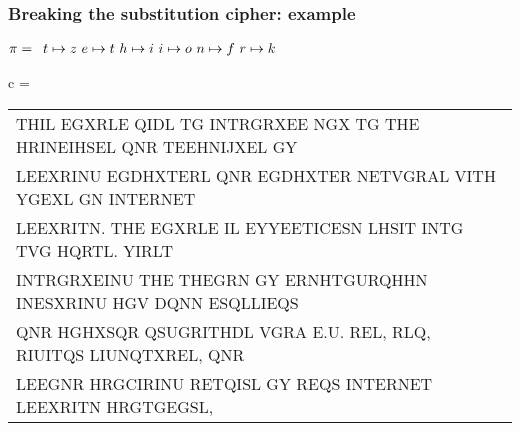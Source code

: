 \documentclass[aspectratio=169, lualatex, handout, 10pt,dvipsnames,svgnames]{beamer} %
\def\enbleu#1{\textcolor{bleu}{#1}}
\def\enrouge#1{\textcolor{rouge}{#1}}
\begin{document}
\begin{frame}
  \frametitle{Breaking the substitution cipher: example}
  
    \enrouge{
    \tiny{$\pi=
      \begin{array}[t]{l}
      t\mapsto z\ e\mapsto t\ h\mapsto i\ i\mapsto o\ n\mapsto f\ r\mapsto k
       \end{array}
      $}}
  \vspace{0.25cm}

  \color{vert}
  \tiny{c =
    \begin{tabular}[t]{l}
      \enbleu{T}\enbleu{H}\enbleu{I}L EGX\enbleu{R}L\enbleu{E} Q\enbleu{I}DL \enbleu{T}G \enbleu{I}\enbleu{N}\enbleu{T}\enbleu{R}GRXE\enbleu{E} NGX \enbleu{T}G \enbleu{T}\enbleu{H}\enbleu{E} H\enbleu{R}\enbleu{I}\enbleu{N}E\enbleu{I}HS\enbleu{E}L Q\enbleu{N}R \enbleu{T}\enbleu{E}E\enbleu{H}\enbleu{N}\enbleu{I}JX\enbleu{E}L GY \\
      L\enbleu{E}EX\enbleu{R}\enbleu{I}\enbleu{N}U EGDHX\enbleu{T}\enbleu{E}\enbleu{R}L Q\enbleu{N}R EGDHX\enbleu{T}\enbleu{E}\enbleu{R} \enbleu{N}\enbleu{E}\enbleu{T}VG\enbleu{R}AL V\enbleu{I}\enbleu{T}\enbleu{H} YGEXL G\enbleu{N} \enbleu{I}\enbleu{N}\enbleu{T}\enbleu{E}\enbleu{R}\enbleu{N}\enbleu{E}\enbleu{T} \\
      L\enbleu{E}EX\enbleu{R}\enbleu{I}\enbleu{T}N. \enbleu{T}\enbleu{H}\enbleu{E} EGX\enbleu{R}L\enbleu{E} \enbleu{I}L \enbleu{E}YY\enbleu{E}E\enbleu{T}\enbleu{I}C\enbleu{E}SN LHS\enbleu{I}\enbleu{T} \enbleu{I}\enbleu{N}\enbleu{T}G \enbleu{T}VG HQ\enbleu{R}\enbleu{T}L. Y\enbleu{I}\enbleu{R}L\enbleu{T} \\
      \enbleu{I}\enbleu{N}\enbleu{T}\enbleu{R}GRXE\enbleu{I}\enbleu{N}U \enbleu{T}\enbleu{H}\enbleu{E} \enbleu{T}\enbleu{H}\enbleu{E}G\enbleu{R}N GY E\enbleu{R}NH\enbleu{T}GU\enbleu{R}QH\enbleu{H}N \enbleu{I}\enbleu{N}ESXR\enbleu{I}\enbleu{N}U \enbleu{H}GV DQ\enbleu{N}N ESQLL\enbleu{I}EQS \\
      Q\enbleu{N}R HGHXSQ\enbleu{R} QSUG\enbleu{R}\enbleu{I}\enbleu{T}\enbleu{H}DL VG\enbleu{R}A \enbleu{E}.U. R\enbleu{E}L, \enbleu{R}LQ, R\enbleu{I}U\enbleu{I}\enbleu{T}QS L\enbleu{I}U\enbleu{N}Q\enbleu{T}X\enbleu{R}\enbleu{E}L, Q\enbleu{N}R \\
      L\enbleu{E}EG\enbleu{N}R H\enbleu{R}GC\enbleu{I}R\enbleu{I}\enbleu{N}U R\enbleu{E}\enbleu{T}Q\enbleu{I}SL GY \enbleu{R}\enbleu{E}QS \enbleu{I}\enbleu{N}\enbleu{T}\enbleu{E}\enbleu{R}\enbleu{N}\enbleu{E}\enbleu{T} L\enbleu{E}EX\enbleu{R}\enbleu{I}\enbleu{T}N H\enbleu{R}G\enbleu{T}GEGSL, \\

\end{tabular}}
\end{frame}
\end{document}
